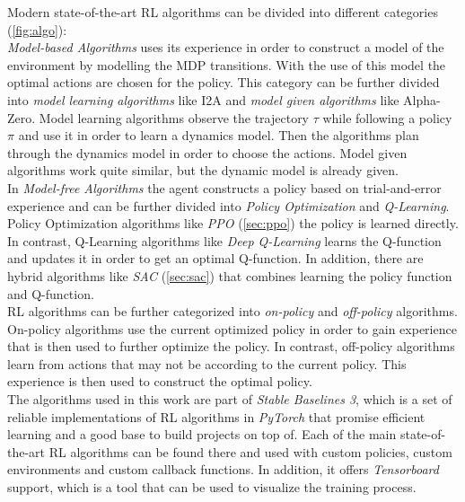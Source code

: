 Modern state-of-the-art RL algorithms can be divided into different categories (\cref{fig:algo}):\\
\emph{Model-based Algorithms} uses its experience in order to construct a model of the environment by modelling the MDP transitions. 
With the use of this model the optimal actions are chosen for the policy. This category can be further divided into \emph{model learning algorithms} 
like I2A and \emph{model given algorithms} like Alpha-Zero. 
Model learning algorithms observe the trajectory $\tau$ while following a policy $\pi$ and use it in order to learn a dynamics model. 
Then the algorithms plan through the dynamics model in order to choose the actions.
Model given algorithms work quite similar, but the dynamic model is already given.\\
In \emph{Model-free Algorithms} the agent constructs a policy based on trial-and-error experience and can be further divided into 
\emph{Policy Optimization} and \emph{Q-Learning}.
Policy Optimization algorithms like \emph{PPO} (\cref{sec:ppo}) the policy is learned directly. 
In contrast, Q-Learning algorithms like \emph{Deep Q-Learning} learns the Q-function and updates it in order to get an optimal Q-function. 
In addition, there are hybrid algorithms like \emph{SAC} (\cref{sec:sac}) that combines learning the policy function and Q-function.\\
RL algorithms can be further categorized into \emph{on-policy} and \emph{off-policy} algorithms. 
On-policy algorithms use the current optimized policy in order to gain experience that is then used to further optimize the policy. 
In contrast, off-policy algorithms learn from actions that may not be according to the current policy. 
This experience is then used to construct the optimal policy.\\
The algorithms used in this work are part of \emph{Stable Baselines 3}\cite{stable-baselines3}, 
which is a set of reliable implementations of RL algorithms in \emph{PyTorch} that promise efficient learning and a good base to build projects on top of. 
Each of the main state-of-the-art RL algorithms can be found there and used with custom policies, custom environments and custom callback functions. 
In addition, it offers \emph{Tensorboard} support, which is a tool that can be used to visualize the training process.

\newpage

